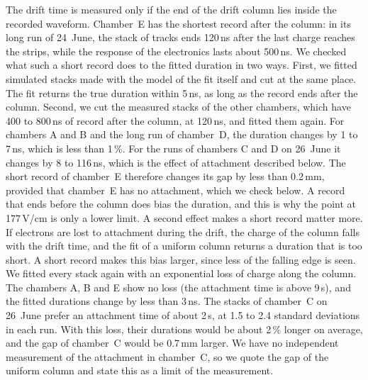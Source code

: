 The drift time is measured only if the end of the drift column lies inside the recorded waveform. Chamber~E has the
shortest record after the column: in its long run of 24~June, the stack of tracks ends 120\,ns after the last charge
reaches the strips, while the response of the electronics lasts about 500\,ns. We checked what such a short record
does to the fitted duration in two ways. First, we fitted simulated stacks made with the model of the fit itself and
cut at the same place. The fit returns the true duration within 5\,ns, as long as the record ends after the column.
Second, we cut the measured stacks of the other chambers, which have 400 to 800\,ns of record after the column, at
120\,ns, and fitted them again. For chambers A and B and the long run of chamber~D, the duration changes by 1 to
7\,ns, which is less than 1\,\%. For the runs of chambers C and D on 26~June it changes by 8 to 116\,ns, which is the
effect of attachment described below. The short record of chamber~E therefore changes its gap by less than 0.2\,mm,
provided that chamber~E has no attachment, which we check below. A record that ends before the column does bias the
duration, and this is why the point at 177\,V/cm is only a lower limit. A second effect makes a short record matter
more. If electrons are lost to attachment during the drift, the charge of the column falls with the drift time,
and the fit of a uniform column returns a duration that is too short. A short record makes this bias larger, since
less of the falling edge is seen. We fitted every stack again with an exponential loss of charge along the column.
The chambers A, B and E show no loss (the attachment time is above 9\,\textmu s), and the fitted durations change by
less than 3\,ns. The stacks of chamber~C on 26~June prefer an attachment time of about 2\,\textmu s, at 1.5 to 2.4
standard deviations in each run. With this loss, their durations would be about 2\,\% longer on average, and the gap
of chamber~C would be 0.7\,mm larger. We have no independent measurement of the attachment in chamber~C, so we
quote the gap of the uniform column and state this as a limit of the measurement.

